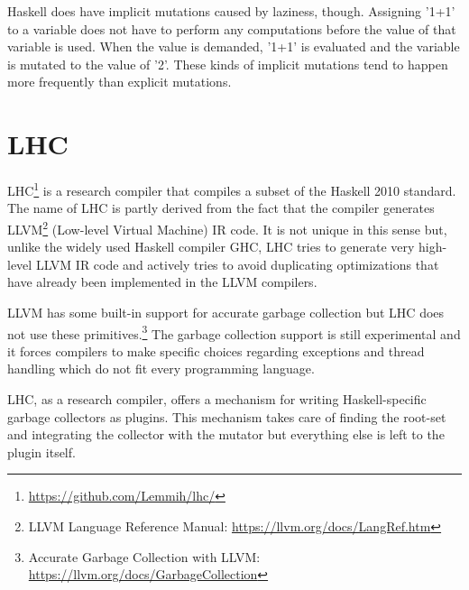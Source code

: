 \documentclass[a4paper,oneside]{memoir}
\begin{document}
Haskell does have implicit mutations caused by laziness, though. Assigning
'1+1' to a variable does not have to perform any computations before the value
of that variable is used. When the value is demanded, '1+1' is evaluated and
the variable is mutated to the value of '2'. These kinds of implicit mutations
tend to happen more frequently than explicit mutations.



\section{LHC}

LHC\footnote{\url{https://github.com/Lemmih/lhc/}} is a research compiler that
compiles a subset of the Haskell 2010 standard. The name of LHC is partly
derived from the fact that the compiler generates
LLVM\footnote{LLVM Language Reference Manual: \url{https://llvm.org/docs/LangRef.htm}}
(Low-level Virtual Machine) IR code. It is not unique in this sense but, unlike
the widely used Haskell compiler GHC, LHC tries to generate very high-level LLVM
IR code and actively tries to
avoid duplicating optimizations that have already been implemented in the LLVM
compilers.

LLVM has some built-in support for accurate garbage collection but LHC does not
use these primitives.\footnote{Accurate Garbage Collection with LLVM: \url{https://llvm.org/docs/GarbageCollection}}
The garbage collection support is still experimental and it forces compilers to
make specific choices regarding exceptions and thread handling which do not fit
every programming language.

LHC, as a research compiler, offers a mechanism for writing Haskell-specific
garbage collectors as plugins. This mechanism takes care of finding the root-set
and integrating the collector with the mutator but everything else is left to
the plugin itself.
\end{document}
